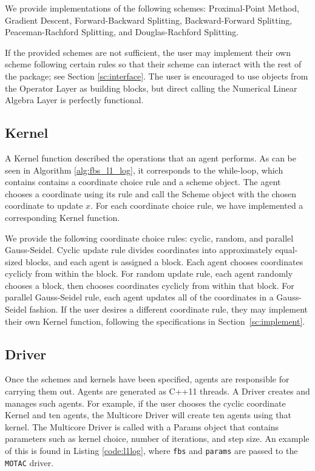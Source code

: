 We provide implementations of the following schemes:  Proximal-Point Method,  Gradient Descent, Forward-Backward Splitting, Backward-Forward Splitting, Peaceman-Rachford Splitting, and Douglas-Rachford Splitting.

If the provided schemes are not sufficient, the user may implement their own scheme following certain rules so that their scheme can interact with the rest of the package; see Section \ref{sc:interface}.
The user is encouraged to use objects from the Operator Layer as building blocks, but direct calling the Numerical Linear Algebra Layer is perfectly functional. %

\subsection{Kernel}
A Kernel function described the operations that an agent performs.
As can be seen in Algorithm \ref{alg:fbs_l1_log}, it corresponds to the while-loop, which contains contains a coordinate choice rule and a scheme object.
The agent chooses a coordinate using its rule and call the Scheme object with the chosen coordinate to update $x$.
For each coordinate choice rule, we have implemented a corresponding Kernel function.

We provide the following coordinate choice rules: cyclic, random, and parallel Gauss-Seidel.
Cyclic update rule divides coordinates into approximately equal-sized blocks, and each agent is assigned a block.
Each agent chooses coordinates cyclicly from within the block.
For random update rule, each agent randomly chooses a block, then chooses coordinates cyclicly from within that block.
For parallel Gauss-Seidel rule, each agent updates all of the coordinates in a Gauss-Seidel fashion.
If the user desires a different coordinate rule, they may implement their own Kernel function, following the specifications in Section~\ref{sc:implement}.


\subsection{Driver}

Once the schemes and kernels have been specified, agents are responsible for carrying them out. Agents are generated as C++11 threads.
A Driver creates and manages such agents.
For example, if the user chooses the cyclic coordinate Kernel and ten agents, the Multicore Driver will create ten agents using that kernel. %
The Multicore Driver is called with a Params object that contains parameters such as kernel choice, number of iterations, and step size.
An example of this is found in Listing \ref{code:l1log}, where \texttt{fbs} and \texttt{params} are passed to the \texttt{MOTAC} driver.

